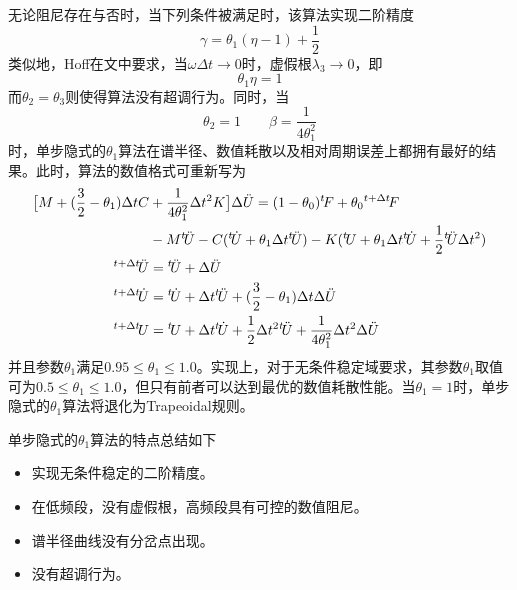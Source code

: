 无论阻尼存在与否时，当下列条件被满足时，该算法实现二阶精度
\begin{equation}
\gamma=\theta_1(\eta-1)+\frac{1}{2}
\end{equation}
类似地，Hoff在文中要求，当$\omega\Delta t\to0$时，虚假根$\lambda_3\to0$，即
\begin{equation}
\theta_1\eta=1
\end{equation}
而$\theta_2=\theta_3$则使得算法没有超调行为。同时，当
\begin{equation}
\theta_2=1\qquad \beta=\frac{1}{4\theta_1^2}
\end{equation}
时，单步隐式的$\theta_1$算法在谱半径、数值耗散以及相对周期误差上都拥有最好的结果。此时，算法的数值格式可重新写为
\begin{subequations}
\begin{align}
\big[ M+(\frac{3}{2}-\theta_1)\Delta tC&+\frac{1}{4\theta_1^2}\Delta t^2K \big]\Delta\ddot{U}=(1-\theta_0){^t\!F}+\theta_0{^{t+\Delta t}\!F}\\
&-M{^t\!\ddot{U}}-C({^t\!\dot{U}}+\theta_1\Delta t{^t\!\ddot{U}})-K({^t\!U}+\theta_1\Delta t{^t\!\dot{U}}+\frac{1}{2}{^t\!\ddot{U}}\Delta t^2)\notag\\
{^{t+\Delta t}\!\ddot{U}}&={^t\!\ddot{U}}+\Delta \ddot{U}\\
{^{t+\Delta t}\!\dot{U}}&={^t\!\dot{U}}+\Delta t{^t\!\ddot{U}}+(\frac{3}{2}-\theta_1)\Delta t\Delta\ddot{U}\\
{^{t+\Delta t}\!U}&={^t\!U}+\Delta t{^t\!\dot{U}}+\frac12\Delta t^2{^t\!\ddot{U}}+\frac{1}{4\theta_1^2}\Delta t^2\Delta\ddot{U}
\end{align}
\end{subequations}
并且参数$\theta_1$满足$0.95\le\theta_1\le1.0$。实现上，对于无条件稳定域要求，其参数$\theta_1$取值可为$0.5\le\theta_1\le1.0$，但只有前者可以达到最优的数值耗散性能。当$\theta_1=1$时，单步隐式的$\theta_1$算法将退化为Trapeoidal规则。

单步隐式的$\theta_1$算法的特点总结如下
\begin{itemize}
\item[\ddag] 实现无条件稳定的二阶精度。
\item[\ddag] 在低频段，没有虚假根，高频段具有可控的数值阻尼。
\item[\ddag] 谱半径曲线没有分岔点出现。
\item[\ddag] 没有超调行为。
\end{itemize}









